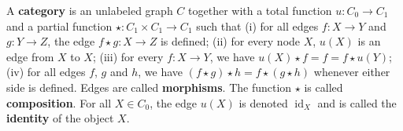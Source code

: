\begin{definition}
    \label{def:cat}
    A \textbf{category} is an unlabeled graph \( C \) together with a total function \( u : C_0 \mathop{\to} C_1 \) and a partial function \( \star: C_1 \mathop{\times} C_1 \mathop{\to} C_1 \) such that 
        (i) for all edges \( f:X \mathop{\to} Y \) and \( g:Y \mathop{\to} Z \), the edge \( f \mathop{\star} g :X \mathop{\to} Z \) is defined; 
        (ii) for every node \( X \), \( u(X) \) is an edge from \( X \) to \( X \);
        (iii) for every \( f:X \mathop{\to} Y \), we have \(u(X) \mathop{\star} f \mathop{=} f \mathop{=} f \mathop{\star} u(Y)\);
        (iv) for all edges \( f \), \( g \) and \(h\), we have \( (f \mathop{\star} g) \mathop{\star} h \mathop{=} f \mathop{\star} (g \mathop{\star} h) \) whenever either side is defined.
    Edges are called \textbf{morphisms}. The function $\star$ is called \textbf{composition}. For all \( X \mathop{\in} C_0 \), the edge \( u(X) \) is denoted \( \operatorname{id}_X \) and is called the \textbf{identity} of the object \( X \).
\end{definition} 